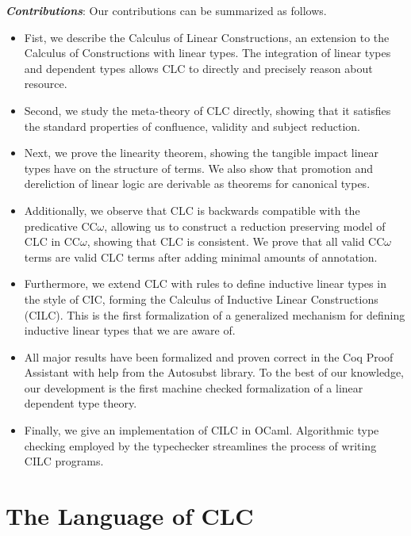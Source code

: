 \documentclass[sigplan,screen,review,authordraft]{acmart}
\begin{document}
\noindent \textbf{\textit{Contributions}}:
Our contributions can be summarized as follows.
\begin{itemize}
  \item Fist, we describe the Calculus of Linear Constructions, an extension to the Calculus of Constructions with linear types. The integration of linear types and dependent types allows CLC to directly and precisely reason about resource.
  \item Second, we study the meta-theory of CLC directly, showing that it satisfies the standard properties of confluence, validity and subject reduction.
  \item Next, we prove the linearity theorem, showing the tangible impact linear types have on the structure of terms. We also show that promotion and dereliction of linear logic are derivable as theorems for canonical types.
  \item Additionally, we observe that CLC is backwards compatible with the predicative CC$\omega$, allowing us to construct a reduction preserving model of CLC in CC$\omega$, showing that CLC is consistent. We prove that all valid CC$\omega$ terms are valid CLC terms after adding minimal amounts of annotation.
  \item Furthermore, we extend CLC with rules to define inductive linear types in the style of CIC, forming the Calculus of Inductive Linear Constructions (CILC). This is the first formalization of a generalized mechanism for defining inductive linear types that we are aware of.
  \item All major results have been formalized and proven correct in the Coq Proof Assistant with help from the Autosubst \cite{autosubst} library. To the best of our knowledge, our development is the first machine checked formalization of a linear dependent type theory.
  \item Finally, we give an implementation of CILC in OCaml. Algorithmic type checking employed by the typechecker streamlines the process of writing CILC programs.
\end{itemize}

\section{The Language of CLC}
\end{document}
